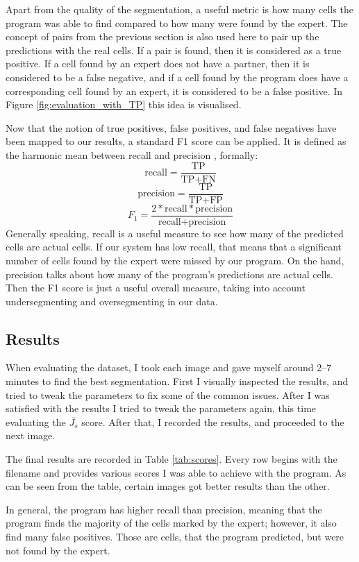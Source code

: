 \documentclass[
  digital,     %
  oneside,     %
  nosansbold,  %
  nocolorbold, %
  lof,         %
  lot,         %
]{fithesis4}
\begin{document}
Apart from the quality of the segmentation, a useful metric is how many cells
the program was able to find compared to how many were found by the expert. The
concept of pairs from the previous section is also used here to pair up the
predictions with the real cells. If a pair is found, then it is considered as a
true positive. If a cell found by an expert does not have a partner, then it is
considered to be a false negative, and if a cell found by the program does have
a corresponding cell found by an expert, it is considered to be a false
positive. In Figure \ref{fig:evaluation_with_TP} this idea is visualised.

Now that the notion of true positives, false positives, and false negatives have
been mapped to our results, a standard F1 score can be applied. It is defined as
the harmonic mean between recall and precision \cite{sklearn-f1score}, formally:
$$\text{recall} = \frac{\text{TP}}{\text{TP} + \text{FN}}$$
$$\text{precision} = \frac{\text{TP}}{\text{TP} + \text{FP}}$$
$$F_1 = \frac{2 * \text{recall} * \text{precision}}{\text{recall} +
\text{precision}}$$
Generally speaking, recall is a useful measure to see how many of the predicted
cells are actual cells. If our system has low recall, that means that a
significant number of cells found by the expert were missed by our program. On
the hand, precision talks about how many of the program's predictions are actual
cells. Then the F1 score is just a useful overall measure, taking into account
undersegmenting and oversegmenting in our data.

\subsection{Results}
When evaluating the dataset, I took each image and gave myself around 2--7
minutes to find the best segmentation. First I visually inspected the results,
and tried to tweak the parameters to fix some of the common issues. After I was
satisfied with the results I tried to tweak the parameters again, this time
evaluating the $\overline{J_s}$ score. After that, I recorded the results, and
proceeded to the next image.

The final results are recorded in Table \ref{tab:scores}. Every row begins
with the filename and provides various scores I was able to achieve with the
program. As can be seen from the table, certain images got better results than
the other. 

In general, the program has higher recall than precision, meaning that the
program finds the majority of the cells marked by the expert; however, it also
find many false positives. Those are cells, that the program predicted, but were
not found by the expert.
\end{document}
